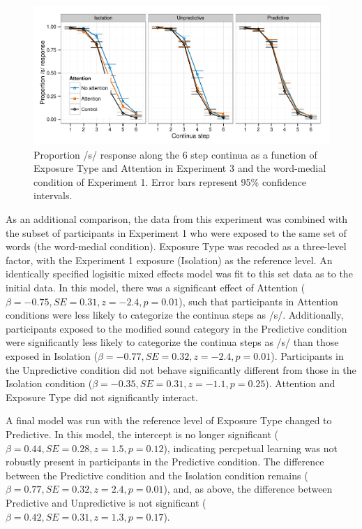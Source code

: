 \begin{figure}[!ht]
\caption{Proportion /s/ response along the 6 step continua as a function of Exposure Type and Attention in Experiment 3 and the word-medial condition of Experiment 1.  Error bars represent 95\% confidence intervals.}
\label{fig:exp23categ}
\begin{center}
\includegraphics[width=\textwidth]{graphs/exp23_categresults}
\end{center}
\end{figure}


As an additional comparison, the data from this experiment was combined with the subset of participants in Experiment 1 who were exposed to the same set of words (the word-medial condition).  Exposure Type was recoded as a three-level factor, with the Experiment 1 exposure (Isolation) as the reference level.  An identically specified logisitic mixed effects model was fit to this set data as to the initial data.  In this model, there was a significant effect of Attention ($\beta = -0.75, SE = 0.31, z = -2.4, p = 0.01$), such that participants in Attention conditions were less likely to categorize the continua steps as /s/.  Additionally, participants exposed to the modified sound category in the Predictive condition were significantly less likely to categorize the continua steps as /s/ than those exposed in Isolation ($\beta = -0.77, SE = 0.32, z = -2.4, p = 0.01$).  Participants in the Unpredictive condition did not behave significantly different from those in the Isolation condition ($\beta = -0.35, SE = 0.31, z = -1.1, p = 0.25$).  Attention and Exposure Type did not significantly interact.

A final model was run with the reference level of Exposure Type changed to Predictive.  In this model, the intercept is no longer significant ($\beta = 0.44, SE = 0.28, z = 1.5, p = 0.12$), indicating percpetual learning was not robustly present in participants in the Predictive condition.  The difference between the Predictive condition and the Isolation condition remains ($\beta = 0.77, SE = 0.32, z = 2.4, p = 0.01$), and, as above, the difference between Predictive and Unpredictive is not significant ($\beta = 0.42, SE = 0.31, z = 1.3, p = 0.17$).


